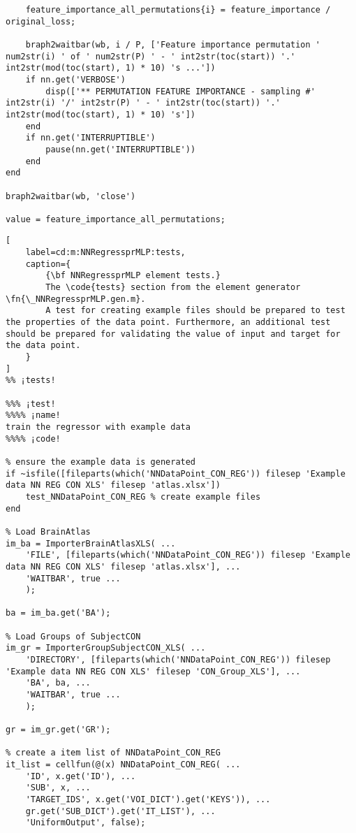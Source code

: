 \documentclass{tufte-handout}
\begin{document}
\begin{lstlisting}
    feature_importance_all_permutations{i} = feature_importance / original_loss;

    braph2waitbar(wb, i / P, ['Feature importance permutation ' num2str(i) ' of ' num2str(P) ' - ' int2str(toc(start)) '.' int2str(mod(toc(start), 1) * 10) 's ...'])
    if nn.get('VERBOSE')
        disp(['** PERMUTATION FEATURE IMPORTANCE - sampling #' int2str(i) '/' int2str(P) ' - ' int2str(toc(start)) '.' int2str(mod(toc(start), 1) * 10) 's'])
    end
    if nn.get('INTERRUPTIBLE')
        pause(nn.get('INTERRUPTIBLE'))
    end
end

braph2waitbar(wb, 'close')

value = feature_importance_all_permutations;
\end{lstlisting}

\clearpage

\begin{lstlisting}[
	label=cd:m:NNRegressprMLP:tests,
	caption={
		{\bf NNRegressprMLP element tests.}
		The \code{tests} section from the element generator \fn{\_NNRegressprMLP.gen.m}.
		A test for creating example files should be prepared to test the properties of the data point. Furthermore, an additional test should be prepared for validating the value of input and target for the data point.
	}
]			
%% ¡tests!

%%% ¡test!
%%%% ¡name!
train the regressor with example data
%%%% ¡code!

% ensure the example data is generated
if ~isfile([fileparts(which('NNDataPoint_CON_REG')) filesep 'Example data NN REG CON XLS' filesep 'atlas.xlsx'])
    test_NNDataPoint_CON_REG % create example files
end

% Load BrainAtlas
im_ba = ImporterBrainAtlasXLS( ...
    'FILE', [fileparts(which('NNDataPoint_CON_REG')) filesep 'Example data NN REG CON XLS' filesep 'atlas.xlsx'], ...
    'WAITBAR', true ...
    );

ba = im_ba.get('BA');

% Load Groups of SubjectCON
im_gr = ImporterGroupSubjectCON_XLS( ...
    'DIRECTORY', [fileparts(which('NNDataPoint_CON_REG')) filesep 'Example data NN REG CON XLS' filesep 'CON_Group_XLS'], ...
    'BA', ba, ...
    'WAITBAR', true ...
    );

gr = im_gr.get('GR');

% create a item list of NNDataPoint_CON_REG
it_list = cellfun(@(x) NNDataPoint_CON_REG( ...
    'ID', x.get('ID'), ...
    'SUB', x, ...
    'TARGET_IDS', x.get('VOI_DICT').get('KEYS')), ...
    gr.get('SUB_DICT').get('IT_LIST'), ...
    'UniformOutput', false);


\end{lstlisting}
\end{document}
